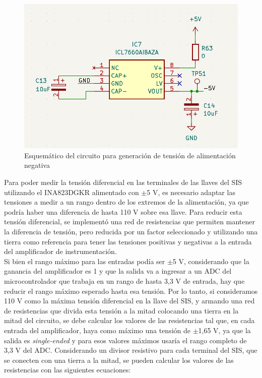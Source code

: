  
\begin{figure}[H]
    \centering
    \includegraphics[width = 0.8 \linewidth]{img/ICL7660AIBAZA.png}
    \caption{Esquemático del circuito para generación de tensión de alimentación negativa}
    \label{fig:ICL7660AIBAZA}
\end{figure}


Para poder medir la tensión diferencial en las terminales de las llaves del SIS utilizando el INA823DGKR alimentado con $\pm$5 V, es necesario adaptar las tensiones a medir a un rango dentro de los extremos de la alimentación, ya que podría haber una diferencia de hasta 110 V sobre esa llave. Para reducir esta tensión diferencial, se implementó una red de resistencias que permiten mantener la diferencia de tensión, pero reducida por un factor seleccionado y utilizando una tierra como referencia para tener las tensiones positivas y negativas a la entrada del amplificador de instrumentación. \\ 

Si bien el rango máximo para las entradas podía ser $\pm$5 V, considerando que la ganancia del amplificador es 1 y que la salida va a ingresar a un ADC del microcontrolador que trabaja en un rango de hasta 3,3 V de entrada, hay que reducir el rango máximo esperado hasta esa tensión. Por lo tanto, si consideramos 110 V como la máxima tensión diferencial en la llave del SIS, y armando una red de resistencias que divida esta tensión a la mitad colocando una tierra en la mitad del circuito, se debe calcular los valores de las resistencias tal que, en cada entrada del amplificador, haya como máximo una tensión de $\pm$1,65 V, ya que la salida es \textit{single-ended} y para esos valores máximos usaría el rango completo de 3,3 V del ADC. Considerando un divisor resistivo para cada terminal del SIS, que se conecten con una tierra a la mitad, se pueden calcular los valores de las resistencias con las siguientes ecuaciones: 

